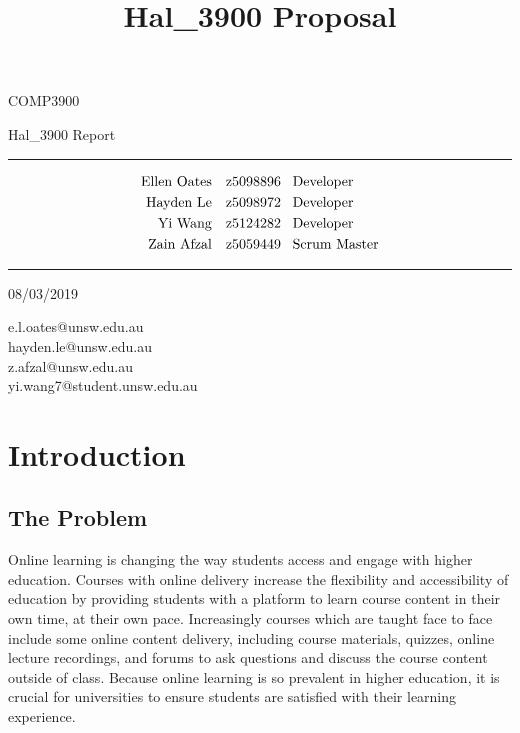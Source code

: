 \documentclass{article}
\title{Hal\_3900 Proposal}
\begin{document}
\begin{LARGE}
\begin{center}
\vspace*{15mm}

COMP3900

Hal\_3900 Report

\rule[4.5pt]{0.8\textwidth}{0.3pt}

\begin{align*}
  \text{Ellen Oates}  \quad &\text{z5098896 \enspace Developer} \\
  \text{Hayden Le}    \quad &\text{z5098972 \enspace Developer} \\
  \text{Yi Wang}      \quad &\text{z5124282 \enspace Developer} \\
  \text{Zain Afzal}   \quad &\text{z5059449 \enspace Scrum Master}
\end{align*}

\vspace*{8mm}
\rule[4.5pt]{0.8\textwidth}{0.3pt}

08/03/2019

\end{center}
\end{LARGE}

\vfill
\small{e.l.oates@unsw.edu.au}\\
\small{hayden.le@unsw.edu.au}\\
\small{z.afzal@unsw.edu.au}\\
\small{yi.wang7@student.unsw.edu.au}

\newpage
\tableofcontents 


\newpage
\section{Introduction}

\subsection{The Problem}
Online learning is changing the way students access and engage with higher education. Courses with online delivery increase the flexibility and accessibility of education by providing students with a platform to learn course content in their own time, at their own pace. Increasingly courses which are taught face to face include some online content delivery, including course materials, quizzes, online lecture recordings, and forums to ask questions and discuss the course content outside of class. Because online learning is so prevalent in higher education, it is crucial for universities to ensure students are satisfied with their learning experience. 
\end{document}
